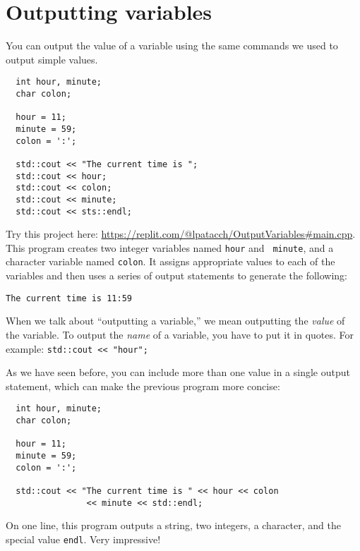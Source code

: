 \section{Outputting variables}
\label{output}

You can output the value of a variable using the same commands
we used to output simple values.
\begin{mdframed}
\begin{verbatim}
  int hour, minute;
  char colon;

  hour = 11;
  minute = 59;
  colon = ':';

  std::cout << "The current time is ";
  std::cout << hour;
  std::cout << colon;
  std::cout << minute;
  std::cout << sts::endl;
\end{verbatim}
\end{mdframed}
%
Try this project here: \url{https://replit.com/@lpatacch/OutputVariables#main.cpp}.
This program creates two integer variables named {\tt hour} and {\tt
minute}, and a character variable named {\tt colon}.  It assigns
appropriate values to each of the variables and then uses a series
of output statements to generate the following:

\begin{verbatim}
The current time is 11:59
\end{verbatim}

When we talk about ``outputting a variable,'' we mean outputting the
{\em value} of the variable.  To output the {\em name} of a variable,
you have to put it in quotes.  For example: {\tt std::cout << "hour";}

As we have seen before, you can include more than one value in
a single output statement, which can make the previous program more
concise:

\begin{mdframed}

\begin{verbatim}
  int hour, minute;
  char colon;

  hour = 11;
  minute = 59;
  colon = ':';

  std::cout << "The current time is " << hour << colon 
                << minute << std::endl;
\end{verbatim}
\end{mdframed}
%
On one line, this program outputs a string, two integers, a character,
and the special value {\tt endl}.  Very impressive!


